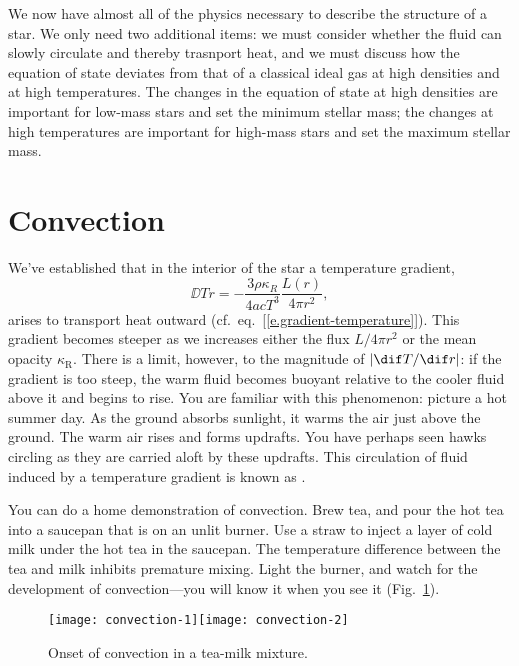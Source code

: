 
We now have almost all of the physics necessary to describe the structure of a star. We only need two additional items: we must consider whether the fluid can slowly circulate and thereby trasnport heat, and we must discuss how the equation of state deviates from that of a classical ideal gas at high densities and at high temperatures. The changes in the equation of state at high densities are important for low-mass stars and set the minimum stellar mass; the changes at high temperatures are important for high-mass stars and set the maximum stellar mass.

\section{Convection}\label{s.convection}

We've established that in the interior of the star a temperature gradient,
\[
	\DD{T}{r} = -\frac{3\rho\kappa_{R}}{4acT^3}\frac{L(r)}{4\pi r^2},
\]
arises to transport heat outward (cf.\ eq.~[\ref{e.gradient-temperature}]).
This gradient becomes steeper as we increases either the flux $L/4\pi r^{2}$ or the mean opacity $\kappa_{\mathrm{R}}$. There is a limit, however, to the magnitude of $|\dif T/\dif r|$: if the gradient is too steep, the warm fluid becomes buoyant relative to the cooler fluid above it and begins to rise. You are familiar with this phenomenon: picture a hot summer day. As the ground absorbs sunlight, it warms the air just above the ground. The warm air rises and forms updrafts. You have perhaps seen hawks circling as they are carried aloft by these updrafts. This circulation of fluid induced by a temperature gradient is known as . 

You can do a home demonstration of convection. Brew tea, and pour the hot tea into a saucepan that is on an unlit burner. Use a straw to inject a layer of cold milk under the hot tea in the saucepan. The temperature difference between the tea and milk inhibits premature mixing. Light the burner, and watch for the development of convection---you will know it when you see it (Fig.~\ref{f.tea}).

\begin{figure}[htbp]
\forceversofloat
\texttt{[image: convection-1]}\texttt{[image: convection-2]}
\caption[Onset of convection]{Onset of convection in a tea-milk mixture.\label{f.tea}}
\end{figure}

